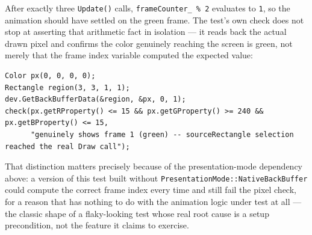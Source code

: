 After exactly three \texttt{Update()} calls, \texttt{frameCounter\_ \% 2} evaluates to
\texttt{1}, so the animation should have settled on the green frame. The test's own check does
not stop at asserting that arithmetic fact in isolation --- it reads back the actual drawn
pixel and confirms the color genuinely reaching the screen is green, not merely that the frame
index variable computed the expected value:

\begin{lstlisting}
Color px(0, 0, 0, 0);
Rectangle region(3, 3, 1, 1);
dev.GetBackBufferData(&region, &px, 0, 1);
check(px.getRProperty() <= 15 && px.getGProperty() >= 240 && px.getBProperty() <= 15,
      "genuinely shows frame 1 (green) -- sourceRectangle selection reached the real Draw call");
\end{lstlisting}

That distinction matters precisely because of the presentation-mode dependency above: a version
of this test built without \texttt{PresentationMode::NativeBackBuffer} could compute the
correct frame index every time and still fail the pixel check, for a reason that has nothing to
do with the animation logic under test at all --- the classic shape of a flaky-looking test
whose real root cause is a setup precondition, not the feature it claims to exercise.
